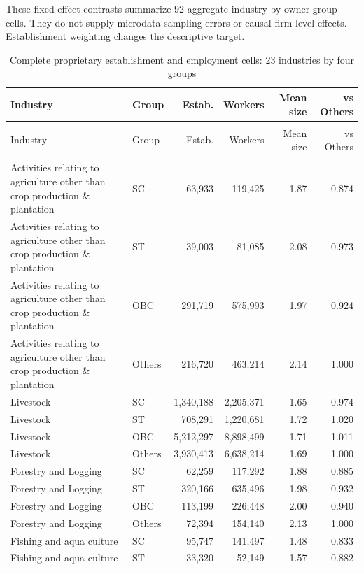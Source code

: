 \documentclass[11pt,a4paper]{report}
\begin{document}
These fixed-effect contrasts summarize 92 aggregate industry by owner-group cells. They do not supply microdata sampling errors or causal firm-level effects. Establishment weighting changes the descriptive target.
\begingroup\footnotesize\setlength{\tabcolsep}{4pt}
\begin{longtable}{>{\raggedright\arraybackslash}p{5cm}lrrrr}
\caption{Complete proprietary establishment and employment cells: 23 industries by four groups}\\\toprule
Industry & Group & Estab. & Workers & Mean size & vs Others \\\midrule\endfirsthead
\multicolumn{6}{l}{\textit{Continued from previous page}}\\\toprule
Industry & Group & Estab. & Workers & Mean size & vs Others \\\midrule\endhead
\midrule\multicolumn{6}{r}{\textit{Continued on next page}}\\\endfoot\bottomrule\endlastfoot
Activities relating to agriculture other than crop production \& plantation & SC & 63,933 & 119,425 & 1.87 & 0.874 \\
Activities relating to agriculture other than crop production \& plantation & ST & 39,003 & 81,085 & 2.08 & 0.973 \\
Activities relating to agriculture other than crop production \& plantation & OBC & 291,719 & 575,993 & 1.97 & 0.924 \\
Activities relating to agriculture other than crop production \& plantation & Others & 216,720 & 463,214 & 2.14 & 1.000 \\
Livestock & SC & 1,340,188 & 2,205,371 & 1.65 & 0.974 \\
Livestock & ST & 708,291 & 1,220,681 & 1.72 & 1.020 \\
Livestock & OBC & 5,212,297 & 8,898,499 & 1.71 & 1.011 \\
Livestock & Others & 3,930,413 & 6,638,214 & 1.69 & 1.000 \\
Forestry and Logging & SC & 62,259 & 117,292 & 1.88 & 0.885 \\
Forestry and Logging & ST & 320,166 & 635,496 & 1.98 & 0.932 \\
Forestry and Logging & OBC & 113,199 & 226,448 & 2.00 & 0.940 \\
Forestry and Logging & Others & 72,394 & 154,140 & 2.13 & 1.000 \\
Fishing and aqua culture & SC & 95,747 & 141,497 & 1.48 & 0.833 \\
Fishing and aqua culture & ST & 33,320 & 52,149 & 1.57 & 0.882 \\

\end{longtable}
\end{document}
